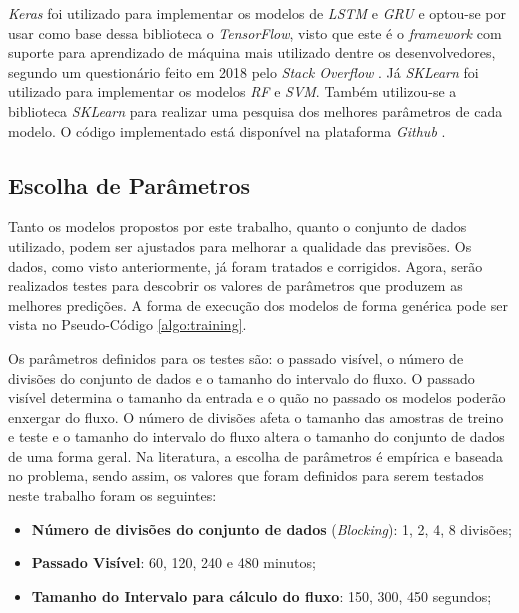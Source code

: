 \textit{Keras} foi utilizado para implementar os modelos de \textit{\acrshort{LSTM}} e \textit{\acrshort{GRU}} e optou-se por usar como base dessa biblioteca o \textit{TensorFlow}, visto que este é o \textit{framework} com suporte para aprendizado de máquina mais utilizado dentre os desenvolvedores, segundo um questionário feito em 2018 pelo \textit{Stack Overflow} \cite{stack_2018}. Já \textit{SKLearn} foi utilizado para implementar os modelos \textit{\acrshort{RF}} e \textit{\acrshort{SVM}}. Também utilizou-se a biblioteca \textit {SKLearn} para realizar uma pesquisa dos melhores parâmetros de cada modelo. O código implementado está disponível na plataforma \textit{Github} \footnotemark.


\subsection{Escolha de Parâmetros}

Tanto os modelos propostos por este trabalho, quanto o conjunto de dados utilizado, podem ser ajustados para melhorar a qualidade das previsões. Os dados, como visto anteriormente, já foram tratados e corrigidos. Agora, serão realizados testes para descobrir os valores de parâmetros que produzem as melhores predições. A forma de execução dos modelos de forma genérica pode ser vista no Pseudo-Código \ref{algo:training}.

Os parâmetros definidos para os testes são: o passado visível, o número de divisões do conjunto de dados e o tamanho do intervalo do fluxo. O passado visível determina o tamanho da entrada e o quão no passado os modelos poderão enxergar do fluxo. O número de divisões afeta o tamanho das amostras de treino e teste e o tamanho do intervalo do fluxo altera o tamanho do conjunto de dados de uma forma geral. Na literatura, a escolha de parâmetros é empírica e baseada no problema, sendo assim, os valores que foram definidos para serem testados neste trabalho foram os seguintes:

\begin{itemize}
    \item \textbf{Número de divisões do conjunto de dados} (\textit{Blocking}): 1, 2, 4, 8 divisões;
    \item \textbf{Passado Visível}: 60, 120, 240 e 480 minutos;
    \item \textbf{Tamanho do Intervalo para cálculo do fluxo}: 150, 300, 450 segundos;
\end{itemize}

